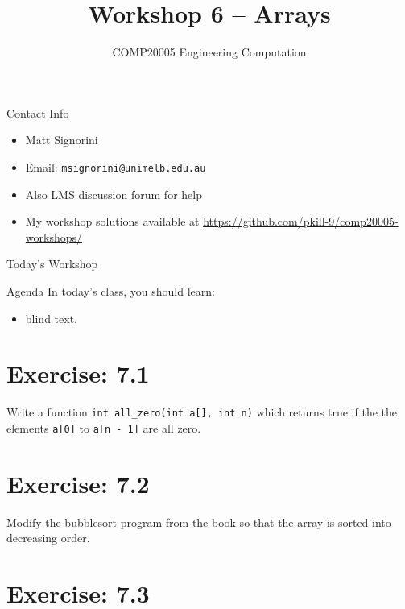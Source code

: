 \documentclass{beamer}
\title{Workshop 6 -- Arrays}
\author{COMP20005 Engineering Computation}
\institute{The University of Melbourne}
\begin{document}
\renewcommand{\tt}[1]{\texttt{#1}}

\begin{frame}
    \titlepage
\end{frame}

\begin{frame}{Contact Info}
    \begin{itemize}
        \item Matt Signorini
        \item Email: \tt{msignorini@unimelb.edu.au}
        \item Also LMS discussion forum for help
        \item My workshop solutions available at \url{https://github.com/pkill-9/comp20005-workshops/}
    \end{itemize}
\end{frame}

\begin{frame}{Today's Workshop}
    \begin{block}{Agenda}
        In today's class, you should learn:
        \begin{itemize}
            \item blind text.
        \end{itemize}
    \end{block}
\end{frame}

\section{Exercise: 7.1}

\begin{frame}{7.1}
    Write a function \tt{int all\_zero(int a[], int n)} which returns true
    if the the elements \tt{a[0]} to \tt{a[n - 1]} are all zero.
\end{frame}

\section{Exercise: 7.2}

\begin{frame}{7.2}
    Modify the bubblesort program from the book so that the array is sorted
    into decreasing order.
\end{frame}

\section{Exercise: 7.3}
\end{document}
